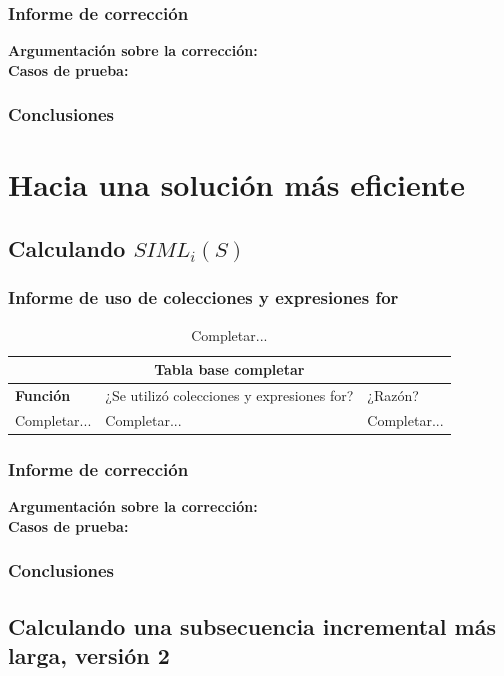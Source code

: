 \documentclass[12pt, a4paper]{article}
\begin{document}
\subsubsection{Informe de corrección}
\textbf{Argumentación sobre la corrección: \\}
\textbf{Casos de prueba: \\}
\subsubsection{Conclusiones}
\section{Hacia una solución más eficiente}
\subsection{Calculando $SIML_i(S)$}
\subsubsection{Informe de uso de colecciones y expresiones for}
\begin{table}[H]
    \scriptsize
   \begin{tabular}{ |p{4cm}|p{3cm}|p{5.5cm}|  }
    \hline
    \multicolumn{3}{|c|}{Tabla base completar} \\
    \hline
    \textbf{Función}& ¿Se utilizó colecciones y expresiones for?  & ¿Razón?\\
    \hline
     Completar... & Completar... &  Completar... \\
     \hline
   \end{tabular}
   \centering
   \caption{Completar...}
   \end{table}
\subsubsection{Informe de corrección}
\textbf{Argumentación sobre la corrección: \\}
\textbf{Casos de prueba: \\}
\subsubsection{Conclusiones}
\subsection{Calculando una subsecuencia incremental más larga, versión 2}
\end{document}
